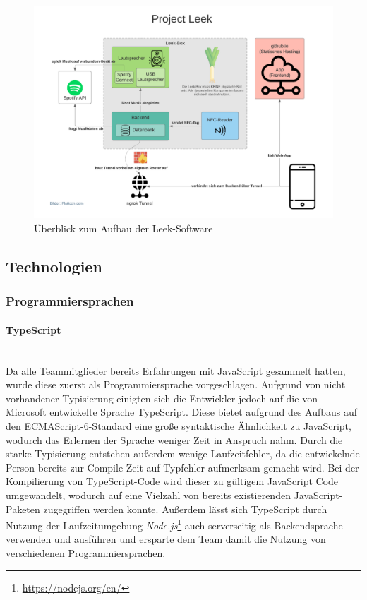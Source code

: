 \documentclass[10pt, a4paper]{article}
\begin{document}
\begin{onehalfspace}
  \begin{figure}[h]
    \includegraphics[width=\linewidth]{LeekSoftware_Overview.png}
    \caption{Überblick zum Aufbau der Leek-Software}
    \label{fig:LeekSoftwareOverview}
  \end{figure}

  \subsection{Technologien}

  \label{technologien}

  \subsubsection{Programmiersprachen}

  \paragraph*{TypeScript} $~$ \\
  Da alle Teammitglieder bereits Erfahrungen mit JavaScript gesammelt hatten, wurde diese zuerst als Programmiersprache vorgeschlagen.
  Aufgrund von nicht vorhandener Typisierung einigten sich die Entwickler jedoch auf die von Microsoft entwickelte Sprache TypeScript. Diese bietet aufgrund des
  Aufbaus auf den ECMAScript-6-Standard eine große syntaktische Ähnlichkeit zu JavaScript, wodurch das Erlernen der Sprache weniger Zeit in Anspruch nahm.
  Durch die starke Typisierung entstehen außerdem wenige Laufzeitfehler, da die entwickelnde Person bereits zur Compile-Zeit auf Typfehler aufmerksam gemacht wird.\cite{Typescript_Typisierung}
  Bei der Kompilierung von TypeScript-Code wird dieser zu gültigem JavaScript Code umgewandelt, wodurch auf eine Vielzahl von bereits existierenden JavaScript-Paketen zugegriffen werden konnte.
  Außerdem lässt sich TypeScript durch Nutzung der Laufzeitumgebung \textit{Node.js}\footnote{\url{https://nodejs.org/en/}} auch serverseitig als Backendsprache verwenden und ausführen und ersparte dem Team damit die Nutzung von verschiedenen Programmiersprachen.


\end{onehalfspace}
\end{document}
